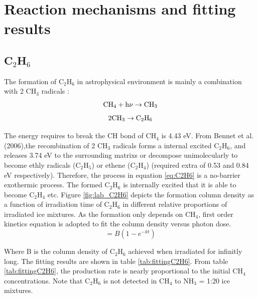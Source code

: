 \section{Reaction mechanisms and fitting results} %
\subsection{C$_2$H$_6$}
The formation of C$_2$H$_6$ in astrophysical environment is mainly a combination with 2 CH$_3$ radicals \cite{bennett2006laboratory}:
\begin{equation}
\rm{CH_4} + h\nu \rightarrow CH_3
\label{eq:CH3}
\end{equation}
\begin{equation}
2 \rm{CH_3} \rightarrow C_2H_6
\label{eq:C2H6}
\end{equation}

The energy requires to break the CH bond of CH$_4$ is 4.43 eV\cite{bennett2006laboratory}. From Bennet et al. (2006)\cite{bennett2006laboratory},the recombination of 2 CH$_3$ radicals forms a internal excited C$_2$H$_6$, and releases 3.74 eV to the surrounding matrixs or decompose unimolecularly to become ethly radicals (C$_2$H$_5$) or ethene (C$_2$H$_4$) (required extra of 0.53\cite{bennett2006laboratory} and 0.84 eV\cite{irle2000molecular} respectively). Therefore, the process in equation \ref{eq:C2H6} is a no-barrier exothermic process. The formed C$_2$H$_6$ is internally excited that it is able to become C$_2$H$_4$ etc. Figure \ref{fig:lab_C2H6} depicts the formation column density as a function of irradiation time of C$_2$H$_6$ in different relative proportions of irradiated ice mixtures.  As the formation only depends on CH$_4$, first order kinetics equation is adopted to fit the column density versus photon dose.\\

\begin{equation}
[\rm{C_2H_6}] = B(1 - e^{-kt})
\label{eq:1step}
\end{equation}

Where B is the column density of C$_2$H$_6$ achieved when irradiated for infinitly long. The fitting results are shown in table \ref{tab:fittingC2H6}. From table \ref{tab:fittingC2H6}, the production rate is nearly proportional to the initial CH$_4$ concentrations.  Note that C$_2$H$_6$ is not detected in CH$_4$ to NH$_3$ = 1:20 ice mixtures.\\

